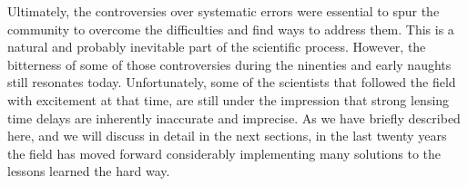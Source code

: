 Ultimately, the controversies over systematic errors were essential to
spur the community to overcome the difficulties and find ways to
address them. This is a natural and probably inevitable part of the
scientific process. However, the bitterness of some of those
controversies during the ninenties and early naughts still resonates
today. Unfortunately, some of the scientists that followed the field
with excitement at that time, are still under the impression that
strong lensing time delays are inherently inaccurate and imprecise. As
we have briefly described here, and we will discuss in detail in the
next sections, in the last twenty years the field has moved forward
considerably implementing many solutions to the lessons learned the
hard way.
